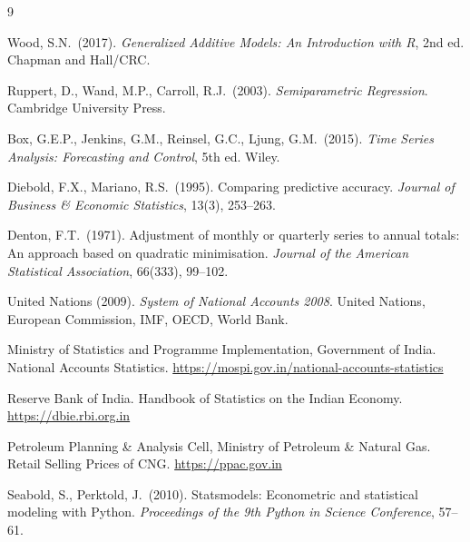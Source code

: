 \documentclass[11pt,a4paper]{article}
\begin{document}
\begin{thebibliography}{9}

Wood, S.N.\ (2017).
\textit{Generalized Additive Models: An Introduction with R}, 2nd ed.
Chapman and Hall/CRC.

Ruppert, D., Wand, M.P., Carroll, R.J.\ (2003).
\textit{Semiparametric Regression}.
Cambridge University Press.

Box, G.E.P., Jenkins, G.M., Reinsel, G.C., Ljung, G.M.\ (2015).
\textit{Time Series Analysis: Forecasting and Control}, 5th ed.
Wiley.

Diebold, F.X., Mariano, R.S.\ (1995).
Comparing predictive accuracy.
\textit{Journal of Business \& Economic Statistics}, 13(3), 253--263.

Denton, F.T.\ (1971).
Adjustment of monthly or quarterly series to annual totals: An approach based
on quadratic minimisation.
\textit{Journal of the American Statistical Association}, 66(333), 99--102.

United Nations (2009).
\textit{System of National Accounts 2008}.
United Nations, European Commission, IMF, OECD, World Bank.

Ministry of Statistics and Programme Implementation, Government of India.
National Accounts Statistics.
\url{https://mospi.gov.in/national-accounts-statistics}

Reserve Bank of India.
Handbook of Statistics on the Indian Economy.
\url{https://dbie.rbi.org.in}

Petroleum Planning \& Analysis Cell, Ministry of Petroleum \& Natural Gas.
Retail Selling Prices of CNG.
\url{https://ppac.gov.in}

Seabold, S., Perktold, J.\ (2010).
Statsmodels: Econometric and statistical modeling with Python.
\textit{Proceedings of the 9th Python in Science Conference}, 57--61.

\end{thebibliography}
\end{document}
